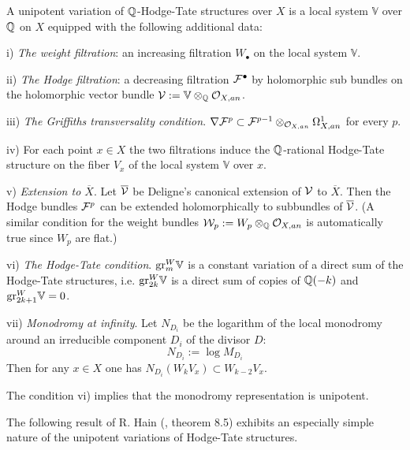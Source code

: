 \documentclass[10pt]{article}
\begin{document}
A  unipotent 
 variation of  ${\mathbb Q}$-Hodge-Tate structures over 
 $X$ is a local system ${\mathbb V}$ over ${\mathbb Q}$ on $X$ equipped with 
the following additional data:

i) {\it The weight filtration}: an  increasing filtration
$W_{\bullet}$ on the local system ${\mathbb V}$.  

ii) {\it The Hodge filtration}:  a decreasing filtration
${\cal F}^{\bullet}$ by holomorphic sub bundles on the holomorphic vector bundle 
${\cal V}:= {\mathbb V} \otimes_{{\mathbb Q}}{\cal O}_{X, an}$. 

iii) {\it The Griffiths transversality condition}. 
$
\nabla {\cal F}^{p} \subset 
{\cal F}^{p-1} \otimes_{{\cal O}_{X, an}} \Omega_{X, an}^1
$ for every $p$.

iv) For each point $x \in X$ the two filtrations induce the   ${\mathbb Q}$-rational Hodge-Tate
 structure  on the fiber $V_x$ of the local system ${\mathbb V}$ over $x$. 

v) {\it Extension to $\overline X$}.  Let $\overline {\cal V}$ be Deligne's canonical extension of ${\cal V}$ to $\overline X$. 
Then the Hodge bundles ${\cal F}^{p}$ 
can be extended holomorphically to subbundles of 
$\overline {\cal V}$. (A similar condition for the weight bundles 
${\cal W}_p:= W_p \otimes_{{\mathbb Q}} {\cal O}_{X, an}$ is automatically true since 
$W_p$ are flat.)


vi) {\it The Hodge-Tate condition}. ${\rm gr}^W_{m}{\mathbb V} $ is a constant variation 
of a direct sum of the Hodge-Tate structures, i.e. 
${\rm gr}^W_{2k}{\mathbb V}$ is a direct sum of copies of ${\mathbb Q}(-k)$ and 
${\rm gr}^W_{2k+1}{\mathbb V} = 0$. 

vii) {\it Monodromy at infinity}. 
Let $N_{D_i}$ be the logarithm of the local monodromy 
around an irreducible component $D_i$ of the divisor $D$:
\begin{equation} \label{3.10.01.3}
N_{D_i}:=  \log M_{D_i}
\end{equation} 
 Then for any $x \in X$ one has 
$
N_{D_i}(W_kV_x) \subset W_{k-2}V_x
$.

The condition vi) implies 
that the monodromy representation is unipotent. 

The following result of R. Hain (\cite{H}, theorem 8.5) 
exhibits an especially simple nature of 
the unipotent variations of Hodge-Tate structures. 
\end{document}
